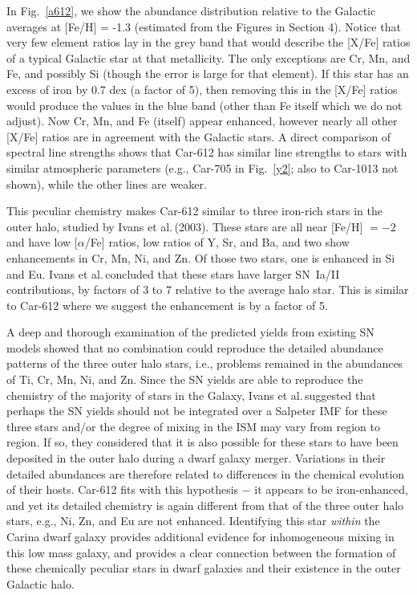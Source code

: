 \documentclass{emulateapj}
\newcommand\etal{{\rm et al.\,}}
\begin{document}
In Fig.~\ref{a612}, we show the abundance distribution relative to 
the Galactic averages at [Fe/H] = -1.3 (estimated from the Figures in 
Section 4).    Notice that very few element ratios lay in the grey
band that would describe the [X/Fe] ratios of a typical Galactic 
star at that metallicity.   The only exceptions are Cr, Mn, and Fe, 
and possibly Si (though the error is large for that element).    
If this star has an excess of iron by 0.7 dex (a factor of 5), 
then removing this in the [X/Fe] ratios would produce the values
in the blue band (other than Fe itself which we do not adjust).   
Now Cr, Mn, and Fe (itself) appear enhanced, however nearly
all other [X/Fe] ratios are in agreement with the Galactic stars.  
A direct comparison of spectral line strengths shows
that Car-612 has similar  line strengths to stars with
similar atmospheric parameters (e.g., Car-705 in Fig.~\ref{y2}; 
also to Car-1013 not shown), while the other lines are weaker.

This peculiar chemistry makes Car-612 similar to three iron-rich 
stars in the outer halo, studied by Ivans \etal (2003).  
These stars are all near [Fe/H] $= -2$ and have 
low [$\alpha$/Fe] ratios, low ratios of Y, Sr, and Ba, 
and two show enhancements in Cr, Mn, Ni, and Zn.   
Of those two stars, one is enhanced in Si and Eu.    
Ivans \etal concluded that these stars have larger SN~Ia/II 
contributions, by factors of 3 to 7 relative to the average 
halo star.  This is similar to Car-612 where we suggest 
the enhancement is by a factor of 5. 
  
A deep and thorough examination of the predicted yields from 
existing SN models showed that no combination could reproduce 
the detailed abundance patterns of the three outer halo stars, 
i.e., problems remained in the abundances of Ti, Cr, Mn, Ni, and Zn.   
Since the SN yields are able to reproduce the chemistry of the
majority of stars in the Galaxy, Ivans \etal suggested that 
perhaps the SN yields should not be integrated over a Salpeter IMF 
for these three stars and/or the degree of mixing in the ISM may 
vary from region to region.   If so, they considered that
it is also possible for these stars to have been deposited in 
the outer halo during a dwarf galaxy merger.   Variations in 
their detailed abundances are therefore related to differences 
in the chemical evolution of their hosts.   
Car-612 fits with this hypothesis $-$ it appears to
be iron-enhanced, and yet its detailed chemistry is again
different from that of the three outer halo stars, 
e.g., Ni, Zn, and Eu are not enhanced.   Identifying this
star {\it within} the Carina dwarf galaxy provides additional
evidence for inhomogeneous mixing in this low mass galaxy, and
provides a clear connection between the formation of these
chemically peculiar stars in dwarf galaxies and their
existence in the outer Galactic halo.
\end{document}
